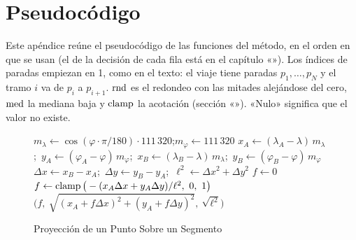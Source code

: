 \chapter{Pseudocódigo}
\label{ap:algoritmos}

Este apéndice reúne el pseudocódigo de las funciones del método, en el orden en que se usan (el de la
decisión de cada fila está en el capítulo «»). Los índices de
paradas empiezan en 1, como en el texto: el viaje tiene paradas $p_1,\dots,p_N$ y el tramo $i$ va de $p_i$ a
$p_{i+1}$. $\operatorname{rnd}$ es el redondeo con las mitades alejándose del cero, $\operatorname{med}$ la mediana baja y $\operatorname{clamp}$ la
acotación (sección «»). «Nulo» significa que el valor no existe.

\begin{figure}[ht]
\caption{Proyección de un Punto Sobre un Segmento}\label{alg:proyeccion}
\begin{algorithmic}[1]
  \State $m_\lambda\gets\cos(\varphi\cdot\pi/180)\cdot111\,320$;\quad $m_\varphi\gets111\,320$
  \State $x_A\gets(\lambda_A-\lambda)\,m_\lambda$;\ $y_A\gets(\varphi_A-\varphi)\,m_\varphi$;\
         $x_B\gets(\lambda_B-\lambda)\,m_\lambda$;\ $y_B\gets(\varphi_B-\varphi)\,m_\varphi$
  \State $\Delta x\gets x_B-x_A$;\ $\Delta y\gets y_B-y_A$;\ $\ell^2\gets\Delta x^2+\Delta y^2$
  \State $f\gets0$
   $f\gets\operatorname{clamp}\big(-(x_A\Delta x+y_A\Delta y)/\ell^2,\ 0,\ 1\big)$ \EndIf
  \State \Return $\big(f,\ \sqrt{(x_A+f\Delta x)^2+(y_A+f\Delta y)^2},\ \sqrt{\ell^2}\big)$ 
\EndFunction
\end{algorithmic}
\end{figure}

